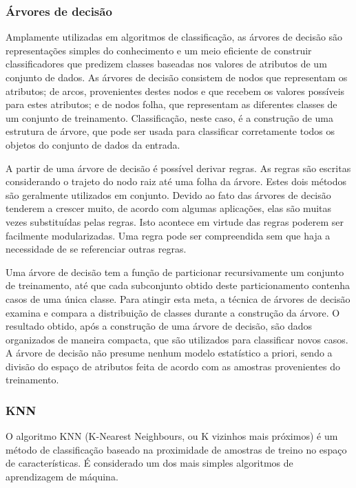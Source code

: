 \subsubsection*{Árvores de decisão}

Amplamente utilizadas em algoritmos de classificação, as árvores de decisão são representações simples do conhecimento e um meio eficiente de construir classificadores que predizem classes baseadas nos valores de atributos de um conjunto de dados. As árvores de decisão consistem de nodos que representam os atributos; de arcos, provenientes destes nodos e que recebem os valores possíveis para estes atributos; e de nodos folha, que representam as diferentes classes de um conjunto de treinamento. Classificação, neste caso, é a construção de uma estrutura de árvore, que pode ser usada para classificar corretamente todos os objetos do conjunto de dados da entrada.

A partir de uma árvore de decisão é possível derivar regras. As regras são escritas considerando o trajeto do nodo raiz até uma folha da árvore. Estes dois métodos são geralmente utilizados em conjunto. Devido ao fato das árvores de decisão tenderem a crescer muito, de acordo com algumas aplicações, elas são muitas vezes substituídas pelas regras. Isto acontece em virtude das regras poderem ser facilmente modularizadas. Uma regra pode ser compreendida sem que haja a necessidade de se referenciar outras regras.

Uma árvore de decisão tem a função de particionar recursivamente um conjunto de treinamento, até que cada subconjunto obtido deste particionamento contenha casos de uma única classe. Para atingir esta meta, a técnica de árvores de decisão examina e compara a distribuição de classes durante a construção da árvore. O resultado obtido, após a construção de uma árvore de decisão, são dados organizados de maneira compacta, que são utilizados para classificar novos casos. A árvore de decisão não presume nenhum modelo estatístico a priori, sendo a divisão do espaço de atributos feita de acordo com as amostras provenientes do treinamento.

\subsubsection*{KNN}

O algoritmo KNN (K-Nearest Neighbours, ou K vizinhos mais próximos) \cite{cover:1967} é um método de classificação baseado na proximidade de amostras de treino no espaço de características. É considerado um dos mais simples algoritmos de aprendizagem de máquina.

